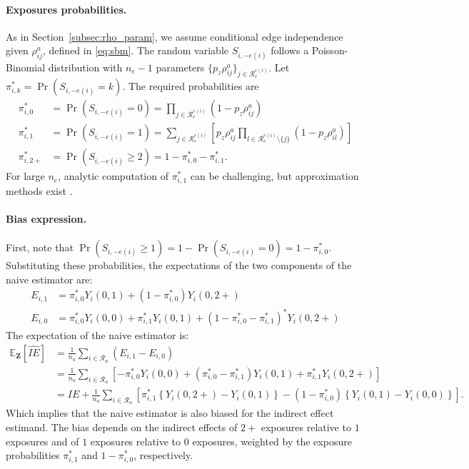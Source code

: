 \documentclass[11pt]{article}
\theoremstyle{definition}
\def \bZ {\boldsymbol{Z}}
\def \cR {\mathcal{R}}
\def \EX {\mathbb{E}}
\begin{document}
\paragraph{Exposures probabilities.}
As in Section~\ref{subsec:rho_param}, we assume conditional edge independence given $\rho^a_{ij}$,
defined in \eqref{eq:sbm}.
The random variable $S_{i, -e(i)}$ follows a Poisson-Binomial distribution
 with $n_e-1$ parameters $\{p_z \rho^a_{ij}\}_{j \in \cR_e^{e(i)}}$. 
 Let $\pi_{i,k}^* = \Pr(S_{i, -e(i)} = k)$. The required probabilities are
\begin{align*}
    \pi_{i,0}^* &= \Pr(S_{i, -e(i)} = 0) =
     \prod_{j \in \cR_e^{e(i)}} (1 - p_z \rho^a_{ij}) \\
    \pi_{i,1}^* &= \Pr(S_{i, -e(i)} = 1) = 
    \sum_{j \in \cR_e^{e(i)}} 
    \left[ p_z \rho^a_{ij}
    \prod_{l \in \cR_e^{e(i)} \setminus \{j\}} (1 - p_z \rho^a_{il})
     \right] \\
    \pi_{i,2+}^* &= \Pr(S_{i, -e(i)} \geq 2) = 1 - \pi_{i,0}^* - \pi_{i,1}^*.
\end{align*}
For large $n_e$, analytic computation of $\pi_{i,1}^*$ can be challenging,
but approximation methods exist \citep{hong2013}.


\paragraph{Bias expression.}
First, note that $\Pr(S_{i, -e(i)}\geq 1) = 1 - \Pr(S_{i, -e(i)}=0) = 1 - \pi_{i,0}^*$.
Substituting these probabilities, the expectations of the two components of the naive estimator are:
\begin{align*}
    E_{i,1} &= \pi_{i,0}^* Y_i(0, 1) + (1 - \pi_{i,0}^*) Y_i(0, 2+)  \\
    E_{i,0} &= \pi_{i,0}^* Y_i(0, 0) + \pi_{i,1}^* Y_i(0, 1) + 
    (1 - \pi_{i,0}^* - \pi_{i,1}^*)^* Y_i(0, 2+) 
\end{align*}
The expectation of the naive estimator is:
\begin{equation}
    \label{apdx.eq:bias_three_level}
    \begin{aligned}
        \EX_{\bZ}\left[\widehat{IE}\right] &=
        \frac{1}{n_a} \sum_{i \in \cR_a} \left( E_{i,1} - E_{i,0} \right)
        \\ &=
        \frac{1}{n_a} \sum_{i \in \cR_a} \left[ -\pi_{i,0}^* Y_i(0, 0) + 
        (\pi_{i,0}^* - \pi_{i,1}^*) Y_i(0, 1) +
         \pi_{i,1}^* Y_i(0, 2+) \right]
         \\ &=
         IE + \frac{1}{n_a} \sum_{i \in \cR_a} \left[
         \pi_{i,1}^*\left\{ Y_i(0, 2+) - Y_i(0, 1) \right\}
         - (1 - \pi_{i,0}^*) \left\{ Y_i(0, 1) - Y_i(0, 0) \right\}
         \right].
    \end{aligned}
\end{equation}
Which implies that the naive estimator is also biased for the indirect effect estimand.
The bias depends on the indirect effects of $2+$ exposures relative to $1$ exposures
and of $1$ exposures relative to $0$ exposures,
weighted by the exposure probabilities $\pi_{i,1}^*$ and $1 - \pi_{i,0}^*$, respectively.
\end{document}
